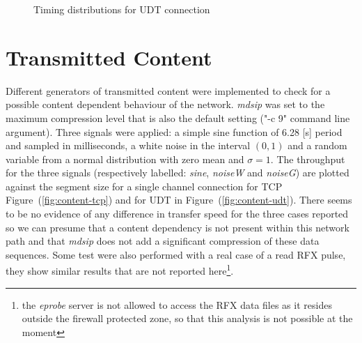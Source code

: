 \documentclass[10pt,a4paper]{article}
\begin{document}
\begin{figure}[ht]
\centerline{
}
\caption[]
{ Timing distributions for UDT connection }
\label{fig:distr-udt}
\end{figure}

\section{Transmitted Content}

Different generators of transmitted content were implemented to check for a possible content dependent behaviour of the network.
\emph{mdsip} was set to the maximum compression level that is also the default setting ("-c 9" command line argument).
Three signals were applied: a simple sine function of 6.28 [s] period and sampled in milliseconds, a white noise in the interval $(0,1)$ and a random variable from a normal distribution with zero mean and $\sigma=1$.
The throughput for the three signals (respectively labelled: \emph{sine}, \emph{noiseW} and \emph{noiseG}) are plotted against the segment size for a single channel connection for TCP Figure~(\ref{fig:content-tcp}) and for UDT in Figure~(\ref{fig:content-udt}).
There seems to be no evidence of any difference in transfer speed for the three cases reported so we can presume that a content dependency is not present within this network path and that \emph{mdsip} does not add a significant compression of these data sequences. Some test were also performed with a real case of a read RFX pulse, they show similar results that are not reported here\footnote{the \emph{eprobe} server is not allowed to access the RFX data files as it resides outside the firewall protected zone, so that this analysis is not possible at the moment}.
\end{document}

